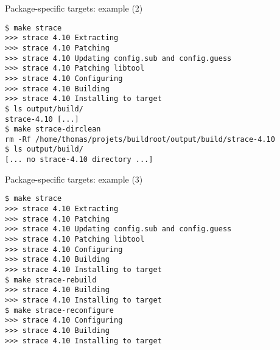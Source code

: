 \begin{frame}[fragile]{Package-specific targets: example (2)}

\begin{block}{}
{\tiny
\begin{verbatim}
$ make strace
>>> strace 4.10 Extracting
>>> strace 4.10 Patching
>>> strace 4.10 Updating config.sub and config.guess
>>> strace 4.10 Patching libtool
>>> strace 4.10 Configuring
>>> strace 4.10 Building
>>> strace 4.10 Installing to target
$ ls output/build/
strace-4.10 [...]
$ make strace-dirclean
rm -Rf /home/thomas/projets/buildroot/output/build/strace-4.10
$ ls output/build/
[... no strace-4.10 directory ...]
\end{verbatim}}
\end{block}

\end{frame}

\begin{frame}[fragile]{Package-specific targets: example (3)}

\begin{block}{}
{\tiny
\begin{verbatim}
$ make strace
>>> strace 4.10 Extracting
>>> strace 4.10 Patching
>>> strace 4.10 Updating config.sub and config.guess
>>> strace 4.10 Patching libtool
>>> strace 4.10 Configuring
>>> strace 4.10 Building
>>> strace 4.10 Installing to target
$ make strace-rebuild
>>> strace 4.10 Building
>>> strace 4.10 Installing to target
$ make strace-reconfigure
>>> strace 4.10 Configuring
>>> strace 4.10 Building
>>> strace 4.10 Installing to target
\end{verbatim}}
\end{block}

\end{frame}

